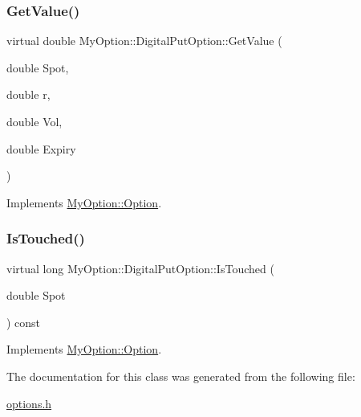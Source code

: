 \subsubsection{\texorpdfstring{Get\+Value()}{GetValue()}\hspace{0.1cm}{\footnotesize\ttfamily [3/3]}}
{\footnotesize\ttfamily virtual double My\+Option\+::\+Digital\+Put\+Option\+::\+Get\+Value (\begin{DoxyParamCaption}\item[{double}]{Spot,  }\item[{double}]{r,  }\item[{double}]{Vol,  }\item[{double}]{Expiry }\end{DoxyParamCaption})\hspace{0.3cm}{\ttfamily [virtual]}}



Implements \hyperlink{classMyOption_1_1Option_a62422d3dc60eabe65cfa94d2a452f5f8}{My\+Option\+::\+Option}.

\hypertarget{classMyOption_1_1DigitalPutOption_a6e38fdd2a8d6f6f959e5cdb0a66e4057}{}\label{classMyOption_1_1DigitalPutOption_a6e38fdd2a8d6f6f959e5cdb0a66e4057} 
\subsubsection{\texorpdfstring{Is\+Touched()}{IsTouched()}}
{\footnotesize\ttfamily virtual long My\+Option\+::\+Digital\+Put\+Option\+::\+Is\+Touched (\begin{DoxyParamCaption}\item[{double}]{Spot }\end{DoxyParamCaption}) const\hspace{0.3cm}{\ttfamily [virtual]}}



Implements \hyperlink{classMyOption_1_1Option_ade57d2fcb9f22f3c2a57d75f55444c33}{My\+Option\+::\+Option}.



The documentation for this class was generated from the following file\+:\begin{DoxyCompactItemize}
\item 
\hyperlink{options_8h}{options.\+h}\end{DoxyCompactItemize}
